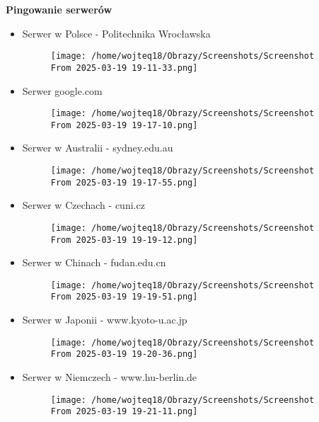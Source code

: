 \documentclass{article}
\begin{document}
\textbf{Pingowanie serwerów}
\begin{itemize}
  \item Serwer w Polsce - Politechnika Wrocławska
    \begin{figure}[H]
      \centering
      \texttt{[image: /home/wojteq18/Obrazy/Screenshots/Screenshot From 2025-03-19 19-11-33.png]}
      \label{fig:ping_politechnika}
    \end{figure}
    \vspace{1\baselineskip}

  \item Serwer google.com
    \begin{figure}[H]
      \centering
      \texttt{[image: /home/wojteq18/Obrazy/Screenshots/Screenshot From 2025-03-19 19-17-10.png]}
      \label{fig:ping_google}
    \end{figure}

  \item Serwer w Australii - sydney.edu.au
    \begin{figure}[H]
      \centering
      \texttt{[image: /home/wojteq18/Obrazy/Screenshots/Screenshot From 2025-03-19 19-17-55.png]}
      \label{fig:ping_sydney}
    \end{figure}

  \item Serwer w Czechach - cuni.cz
    \begin{figure}[H]
      \centering
      \texttt{[image: /home/wojteq18/Obrazy/Screenshots/Screenshot From 2025-03-19 19-19-12.png]}
      \label{fig:ping_cuni}
    \end{figure}
    \vspace{3\baselineskip}

  \item Serwer w Chinach - fudan.edu.cn
    \begin{figure}[H]
      \centering
      \texttt{[image: /home/wojteq18/Obrazy/Screenshots/Screenshot From 2025-03-19 19-19-51.png]}
      \label{fig:ping_fudan}
    \end{figure}

  \item Serwer w Japonii - www.kyoto-u.ac.jp
    \begin{figure}[H]
      \centering
      \texttt{[image: /home/wojteq18/Obrazy/Screenshots/Screenshot From 2025-03-19 19-20-36.png]}
      \label{fig:ping_kyoto}
    \end{figure}

  \item Serwer w Niemczech - www.hu-berlin.de
    \begin{figure}[H]
      \centering
      \texttt{[image: /home/wojteq18/Obrazy/Screenshots/Screenshot From 2025-03-19 19-21-11.png]}
      \label{fig:ping_hu_berlin}
    \end{figure}
\end{itemize}
\end{document}
